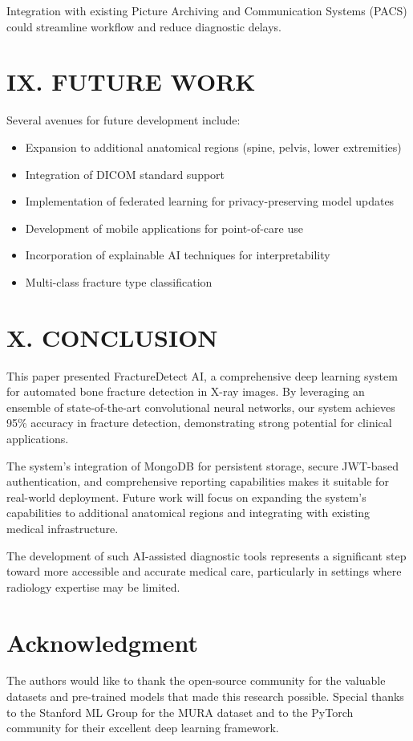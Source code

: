 \documentclass[conference]{IEEEtran}
\begin{document}
Integration with existing Picture Archiving and Communication Systems (PACS) could streamline workflow and reduce diagnostic delays.

\section{IX. FUTURE WORK}
\label{sec:future_work}

Several avenues for future development include:
\begin{itemize}
    \item Expansion to additional anatomical regions (spine, pelvis, lower extremities)
    \item Integration of DICOM standard support
    \item Implementation of federated learning for privacy-preserving model updates
    \item Development of mobile applications for point-of-care use
    \item Incorporation of explainable AI techniques for interpretability
    \item Multi-class fracture type classification
\end{itemize}

\section{X. CONCLUSION}
\label{sec:conclusion}

This paper presented FractureDetect AI, a comprehensive deep learning system for automated bone fracture detection in X-ray images. By leveraging an ensemble of state-of-the-art convolutional neural networks, our system achieves 95\% accuracy in fracture detection, demonstrating strong potential for clinical applications.

The system's integration of MongoDB for persistent storage, secure JWT-based authentication, and comprehensive reporting capabilities makes it suitable for real-world deployment. Future work will focus on expanding the system's capabilities to additional anatomical regions and integrating with existing medical infrastructure.

The development of such AI-assisted diagnostic tools represents a significant step toward more accessible and accurate medical care, particularly in settings where radiology expertise may be limited.

\section*{Acknowledgment}
The authors would like to thank the open-source community for the valuable datasets and pre-trained models that made this research possible. Special thanks to the Stanford ML Group for the MURA dataset and to the PyTorch community for their excellent deep learning framework.



\end{document}
